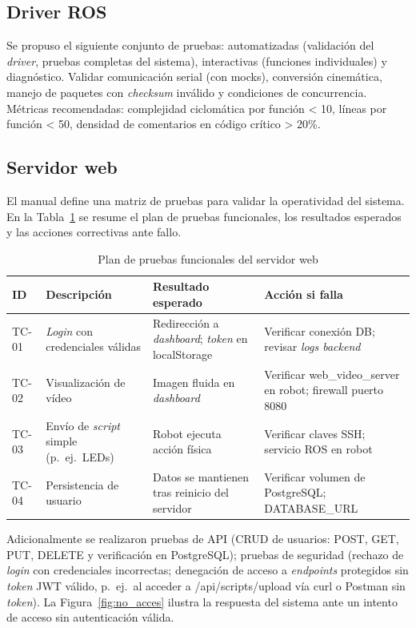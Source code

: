 \documentclass[12pt]{article}
\numberwithin{figure}{section}
\numberwithin{table}{section}
\def\code#1{#1}%
\newcommand{\code}[1]{\textcolor{codeblue}{\url{#1}}}
\begin{document}
\subsection{Driver ROS}

Se propuso el siguiente conjunto de pruebas: automatizadas (validación del \textit{driver}, pruebas completas del sistema), interactivas (funciones individuales) y diagnóstico. Validar comunicación serial (con mocks), conversión cinemática, manejo de paquetes con \textit{checksum} inválido y condiciones de concurrencia. Métricas recomendadas: complejidad ciclomática por función < 10, líneas por función < 50, densidad de comentarios en código crítico > 20\%.


\subsection{Servidor web}

El manual define una matriz de pruebas para validar la operatividad del sistema. En la Tabla~\ref{tab:pruebas_func} se resume el plan de pruebas funcionales, los resultados esperados y las acciones correctivas ante fallo.

\begin{table}[H]
\centering
\caption{Plan de pruebas funcionales del servidor web}
\label{tab:pruebas_func}
\begin{tabular}{p{}p{}p{}p{}}
\toprule
\textbf{ID} & \textbf{Descripción} & \textbf{Resultado esperado} & \textbf{Acción si falla} \\
\midrule
TC-01 & \textit{Login} con credenciales válidas & Redirección a \textit{dashboard}; \textit{token} en \code{localStorage} & Verificar conexión DB; revisar \textit{logs backend} \\
TC-02 & Visualización de vídeo & Imagen fluida en \textit{dashboard} & Verificar \code{web\_video\_server} en robot; firewall puerto 8080 \\
TC-03 & Envío de \textit{script} simple (p.\ ej.\ LEDs) & Robot ejecuta acción física & Verificar claves SSH; servicio ROS en robot \\
TC-04 & Persistencia de usuario & Datos se mantienen tras reinicio del servidor & Verificar volumen de PostgreSQL; \code{DATABASE\_URL} \\
\bottomrule
\end{tabular}
\end{table}

Adicionalmente se realizaron pruebas de API (CRUD de usuarios: POST, GET, PUT, DELETE y verificación en PostgreSQL); pruebas de seguridad (rechazo de \textit{login} con credenciales incorrectas; denegación de acceso a \textit{endpoints} protegidos sin \textit{token} JWT válido, p.\ ej.\ al acceder a \code{/api/scripts/upload} vía \code{curl} o Postman sin \textit{token}). La Figura~\ref{fig:no_acces} ilustra la respuesta del sistema ante un intento de acceso sin autenticación válida.
\end{document}
